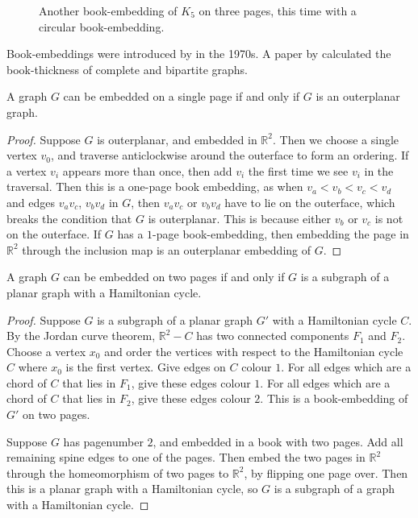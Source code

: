 \begin{figure}[h!]
	\centering
	
	\caption[Three-page circular book-embedding of $K_5$]{Another book-embedding of $K_5$ on three pages, this time with a circular book-embedding.}\label{fig:circular_book-embedding}
\end{figure}

Book-embeddings were introduced by \textcite{kainenRecentResultsTopological1974, ollmannBookThicknessVarious1973} in the 1970s. A paper by \textcite{bernhartBookThicknessGraph1979} calculated the book-thickness of complete and bipartite graphs.
\begin{proposition}\label{lem:Pagenumber_1}
	A graph \(G\) can be embedded on a single page if and only if \(G\) is an outerplanar graph.
\end{proposition}
\begin{proof}
	Suppose $G$ is outerplanar, and embedded in $\mathbb{R}^2$. Then we choose a single vertex $v_0$, and traverse anticlockwise around the outerface to form an ordering. If a vertex $v_i$ appears more than once, then add $v_i$ the first time we see $v_i$ in the traversal. Then this is a one-page book embedding, as when $v_a < v_b < v_c < v_d$ and edges $v_a v_c$, $v_b v_d$ in $G$, then $v_a v_c$ or $v_b v_d$ have to lie on the outerface, which breaks the condition that $G$ is outerplanar. This is because either $v_b$ or $v_c$ is not on the outerface. If $G$ has a $1$-page book-embedding, then embedding the page in $\mathbb{R}^2$ through the inclusion map is an outerplanar embedding of $G$. 
\end{proof}
\begin{proposition}\label{lem:Pagenumber_2}
	A graph \(G\) can be embedded on two pages if and only if \(G\) is a subgraph of a planar graph with a Hamiltonian cycle.
\end{proposition}

\begin{proof}
	Suppose $G$ is a subgraph of a planar graph $G'$ with a Hamiltonian cycle $C$. By the Jordan curve theorem, $\mathbb{R}^2 - C$ has two connected components $F_1$ and $F_2$. Choose a vertex $x_0$ and order the vertices with respect to the Hamiltonian cycle $C$ where $x_0$ is the first vertex. Give edges on $C$ colour $1$. For all edges which are a chord of $C$ that lies in $F_1$, give these edges colour $1$. For all edges which are a chord of $C$ that lies in $F_2$, give these edges colour $2$. This is a book-embedding of $G'$ on two pages. 
	\par
	Suppose $G$ has pagenumber $2$, and embedded in a book with two pages. Add all remaining spine edges to one of the pages. Then embed the two pages in $\mathbb{R}^2$ through the homeomorphism of two pages to $\mathbb{R}^2$, by flipping one page over. Then this is a planar graph with a Hamiltonian cycle, so $G$ is a subgraph of a graph with a Hamiltonian cycle.
\end{proof}
